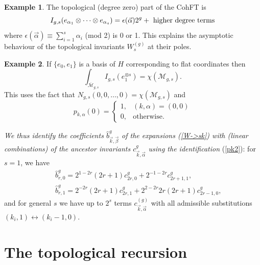 \documentclass[11pt]{article}
\def\bea{\begin{eqnarray}}
\def\eea{\end{eqnarray}}
\newcommand{\modm}{\mathcal{M}}
\def\bea{\begin{eqnarray}}
\def\eea{\end{eqnarray}}
\theoremstyle{plain}
\theoremstyle{definition}
\newtheorem{example}{Example}
\let\text=\mathrm
\def\bea{\begin{eqnarray}}
\def\eea{\end{eqnarray}}
\begin{document}
\begin{example}\label{ex:top}
The topological (degree zero) part of the CohFT is
$$I_{g,s}(e_{\alpha_1}\otimes\cdots\otimes e_{\alpha_s})=\epsilon(\vec{\alpha})2^g+\ \hbox{higher degree terms}$$
where $\displaystyle \epsilon(\vec{\alpha})\equiv\sum_{i=1}^s\alpha_i$ (mod 2) is 0 or 1.
This explains the asymptotic behaviour of the topological invariants $W^{(g)}_{s}$ at their poles.
\end{example}
\begin{example}\label{ex:volume}
If $\{e_0,e_1\}$ is a basis of $H$ corresponding to flat coordinates then
$$\int_{\overline{\modm}_{g,s}}I_{g,s}(e_1^{\otimes s})=\chi(\modm_{g,s}).$$
This uses the fact that $N_{g,s}(0,0,\dots,0)=\chi(\modm_{g,s})$ and
$$p_{k,\alpha}(0)=\left\{\begin{array}{cc} 1,&(k,\alpha)=(0,0)\\
 0,& \text{otherwise}.\end{array}\right.
 $$
\end{example}

{\sl We thus identify the coefficients $\widehat{b}^g_{\vec{k},\vec{\beta}}$ of the expansions (\ref{W->sk}) with (linear 
combinations) of the ancestor invariants $c^g_{\vec{k},\vec{\alpha}}$ using the identification} (\ref{pk2}): for $s=1$, we have
\bea
&{}&\widehat b^g_{r,0}=2^{1-2r}(2r+1)c^g_{2r,0}+2^{-1-2r}c^g_{2r+1,1},\nonumber\\
&{}&\widehat b^g_{r,1}=2^{-2r}(2r+1)c^g_{2r,1}+2^{2-2r}2r(2r+1)c^g_{2r-1,0},\nonumber
\eea
and for general $s$ we have up to $2^s$ terms $c^{(g)}_{\vec k,\vec \alpha}$ with all admissible substitutions
$(k_i,1)\leftrightarrow(k_i-1,0)$.

\section{The topological recursion}\label{s:TR}
\setcounter{equation}{0}

\def\Col#1{
\begin{pspicture}(0.2,1)
\multiput(0,0)(0,0.2){#1}{\psframe(0,0)(0.2,0.2)}
\end{pspicture}
}

\def\ColOne#1{
\begin{pspicture}(0.2,1)
\multiput(0,0)(0,0.2){#1}{\psframe(0,0)(0.2,0.2)}
\rput(0,-0.2){\makebox(0,0)[lb]{\tiny$1$}}
\end{pspicture}
}

\def\ColP#1{
\begin{pspicture}(0.2,1)
\multiput(0,0)(0,0.2){#1}{\psframe(0,0)(0.2,0.2)}
\rput(0,-0.2){\makebox(0,0)[lb]{\tiny $p$}}
\end{pspicture}
}
\end{document}
